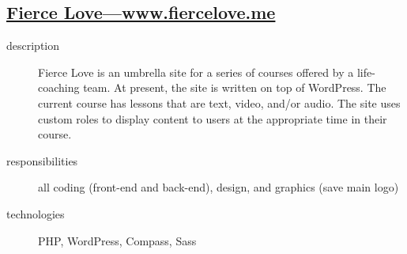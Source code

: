 \documentclass{article}
\begin{document}
\newpage

\subsection{\href{http://www.fiercelove.me}
  {Fierce Love---www.fiercelove.me}}
\label{sub:Fierce Love}

\begin{multicols}{2}

\begin{description}
  \item[description] Fierce Love is an umbrella site for a series of courses offered by a life-coaching team.  At present, the site is written on top of WordPress.  The current course has lessons that are text, video, and/or audio.  The site uses custom roles to display content to users at the appropriate time in their course.
  \item[responsibilities] all coding (front-end and back-end), design, and graphics (save main logo)
  \item[technologies] PHP, WordPress, Compass, Sass
\end{description}

\vfill
\columnbreak
{}
\end{multicols}

\end{document}
